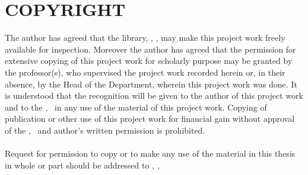 \section*{COPYRIGHT}
\vspace{0.5cm}

The author has agreed that the library, \thedepartment, \thecampus, may make this project
work freely available for inspection. Moreover the author has agreed that the
permission for extensive copying of this project work for scholarly purpose may be
granted by the professor(s), who supervised the project work recorded herein or, in
their absence, by the Head of the Department, wherein this project work was done. It
is understood that the recognition will be given to the author of this project work and
to the \thedepartment, \thecampus \ in any use of the material of this project work. Copying of publication or other use of
this project work for financial gain without approval of the \thedepartment, \thecampus \ and author's
written permission is prohibited.\\
\\
Request for permission to copy or to make any use of the material in this thesis in
whole or part should be addressed to \thedepartment, \thecampus, \thedepartmentFullAddress

